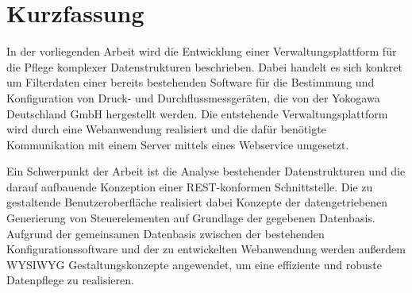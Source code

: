 \chapter*{Kurzfassung}

In der vorliegenden Arbeit wird die Entwicklung einer Verwaltungsplattform für die Pflege komplexer Datenstrukturen beschrieben. Dabei handelt es sich konkret um Filterdaten einer bereits bestehenden Software für die Bestimmung und Konfiguration von Druck- und Durchflussmessgeräten, die von der Yokogawa Deutschland GmbH hergestellt werden. Die entstehende Verwaltungsplattform wird durch eine Webanwendung realisiert und die dafür benötigte Kommunikation mit einem Server mittels eines Webservice umgesetzt.

Ein Schwerpunkt der Arbeit ist die Analyse bestehender Datenstrukturen und die darauf aufbauende Konzeption einer REST-konformen Schnittstelle. Die zu gestaltende Benutzeroberfläche realisiert dabei Konzepte der datengetriebenen Generierung von Steuerelementen auf Grundlage der gegebenen Datenbasis. Aufgrund der gemeinsamen Datenbasis zwischen der bestehenden Konfigurationssoftware und der zu entwickelten Webanwendung werden außerdem \acf{WYSIWYG} Gestaltungskonzepte angewendet, um eine effiziente und robuste Datenpflege zu realisieren.


